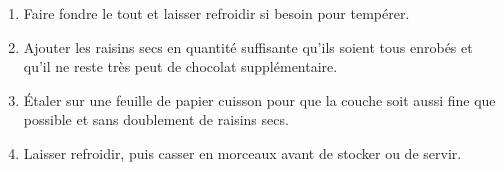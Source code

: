 
\begin{ingredients}
\end{ingredients}


\begin{recipe}
  \begin{enumerate}

  \item Faire fondre le tout et laisser refroidir si besoin pour
    tempérer.

  \item Ajouter les raisins secs en quantité suffisante qu'ils soient
    tous enrobés et qu'il ne reste très peut de chocolat
    supplémentaire.

  \item Étaler sur une feuille de papier cuisson pour que la couche
    soit aussi fine que possible et sans doublement de raisins secs.

  \item Laisser refroidir, puis casser en morceaux avant de stocker ou
    de servir.

  \end{enumerate}
\end{recipe}

